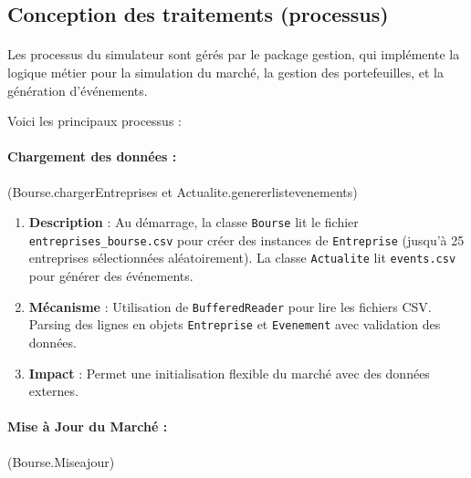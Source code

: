 \subsection{Conception des traitements (processus)}
\paragraph{}Les processus du simulateur sont gérés par le package gestion, qui implémente la logique métier pour la simulation du
marché, la gestion des portefeuilles, et la génération d'événements.

Voici les principaux processus :

\paragraph{ Chargement des données :}(Bourse.chargerEntreprises et Actualite.genererlistevenements) 

\begin{enumerate}
    \item \textbf{Description} : Au démarrage, la classe \texttt{Bourse} lit le fichier \texttt{entreprises\_bourse.csv} pour créer des instances de \texttt{Entreprise} (jusqu'à 25 entreprises sélectionnées aléatoirement). La classe \texttt{Actualite} lit \texttt{events.csv} pour générer des événements.
    
    \item \textbf{Mécanisme} : Utilisation de \texttt{BufferedReader} pour lire les fichiers CSV. Parsing des lignes en objets \texttt{Entreprise} et \texttt{Evenement} avec validation des données.
    
    \item \textbf{Impact} : Permet une initialisation flexible du marché avec des données externes.
\end{enumerate}

\paragraph{Mise à Jour du Marché :} (Bourse.Miseajour) 

